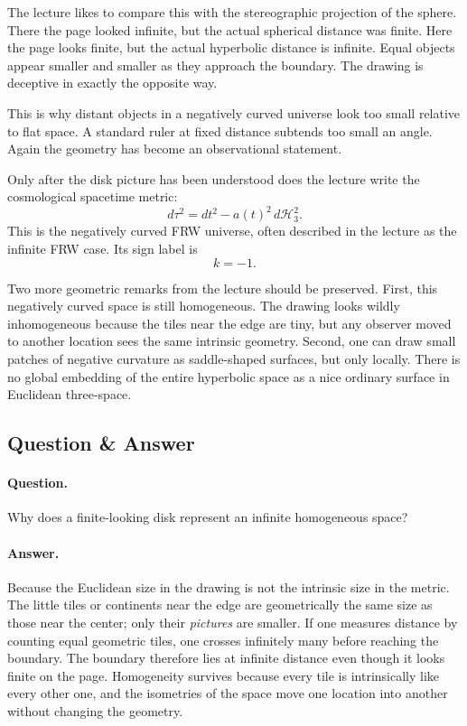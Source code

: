 The lecture likes to compare this with the stereographic projection of the sphere. There the page looked infinite, but the actual spherical distance was finite. Here the page looks finite, but the actual hyperbolic distance is infinite. Equal objects appear smaller and smaller as they approach the boundary. The drawing is deceptive in exactly the opposite way.

This is why distant objects in a negatively curved universe look too small relative to flat space. A standard ruler at fixed distance subtends too small an angle. Again the geometry has become an observational statement.

Only after the disk picture has been understood does the lecture write the cosmological spacetime metric:
\begin{equation}
d\tau^2=dt^2-a(t)^2\,d\mathcal H_3^2.
\end{equation}
This is the negatively curved FRW universe, often described in the lecture as the infinite FRW case. Its sign label is
\begin{equation}
k=-1.
\end{equation}

Two more geometric remarks from the lecture should be preserved. First, this negatively curved space is still homogeneous. The drawing looks wildly inhomogeneous because the tiles near the edge are tiny, but any observer moved to another location sees the same intrinsic geometry. Second, one can draw small patches of negative curvature as saddle-shaped surfaces, but only locally. There is no global embedding of the entire hyperbolic space as a nice ordinary surface in Euclidean three-space.

\subsection{Question \& Answer}

\paragraph{Question.} Why does a finite-looking disk represent an infinite homogeneous space?

\paragraph{Answer.} Because the Euclidean size in the drawing is not the intrinsic size in the metric. The little tiles or continents near the edge are geometrically the same size as those near the center; only their \emph{pictures} are smaller. If one measures distance by counting equal geometric tiles, one crosses infinitely many before reaching the boundary. The boundary therefore lies at infinite distance even though it looks finite on the page. Homogeneity survives because every tile is intrinsically like every other one, and the isometries of the space move one location into another without changing the geometry.

